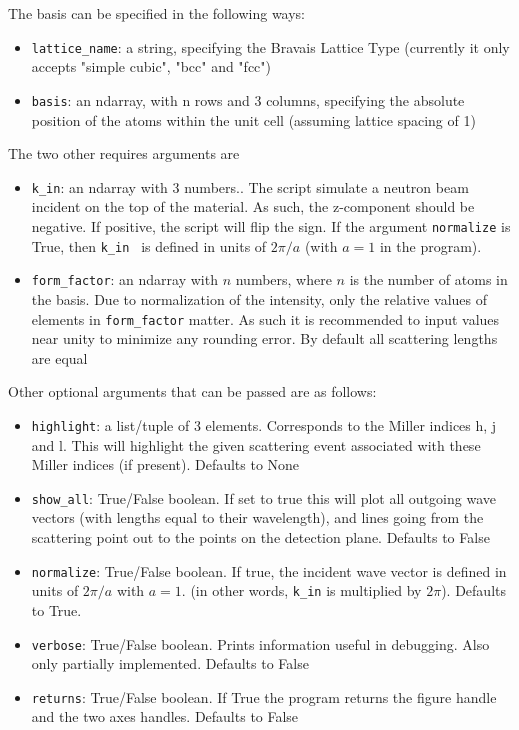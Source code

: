 \documentclass[a4paper,11pt]{article}
\numberwithin{equation}{section}
\begin{document}
	The basis can be specified in the following ways:
	\begin{itemize}
		\item \texttt{lattice\_name}: a string, specifying the Bravais Lattice Type (currently it only accepts "simple cubic", "bcc" and "fcc")
		\item \texttt{basis}: an ndarray, with n rows and 3 columns, specifying the absolute position of the atoms within the unit cell (assuming lattice spacing of 1)
	\end{itemize}
	The two other requires arguments are
	\begin{itemize}
		\item \texttt{k\_in}: an ndarray with 3 numbers.. The script simulate a neutron beam incident on the top of the material. As such, the z-component should be negative. If positive, the script will flip the sign. If the argument \texttt{normalize} is True, then \texttt{k\_in } is defined in units of $ 2\pi/a $ (with $ a = 1$ in the program).
		\item \texttt{form\_factor}: an ndarray with $ n $ numbers, where $ n $ is the number of atoms in the basis. Due to normalization of the intensity, only the relative values of elements in \texttt{form\_factor} matter. As such it is recommended to input values near unity to minimize any rounding error. By default all scattering lengths are equal
	\end{itemize}
	Other optional arguments that can be passed are as follows:
	\begin{itemize}
		\item \texttt{highlight}: a list/tuple of 3 elements. Corresponds to the Miller indices h, j and l. This will highlight the given scattering event associated with these Miller indices (if present). Defaults to None
		\item \texttt{show\_all}: True/False boolean. If set to true this will plot all outgoing wave vectors (with lengths equal to their wavelength), and lines going from the scattering point out to the points on the detection plane. Defaults to False
		\item \texttt{normalize}: True/False boolean. If true, the incident wave vector is defined in units of $ 2\pi/a $ with $ a=1 $. (in other words, \texttt{k\_in} is multiplied by $ 2\pi $). Defaults to True.
		\item \texttt{verbose}: True/False boolean. Prints information useful in debugging. Also only partially implemented. Defaults to False
		\item \texttt{returns}: True/False boolean. If True the program returns the figure handle and the two axes handles. Defaults to False
	\end{itemize}
\end{document}
